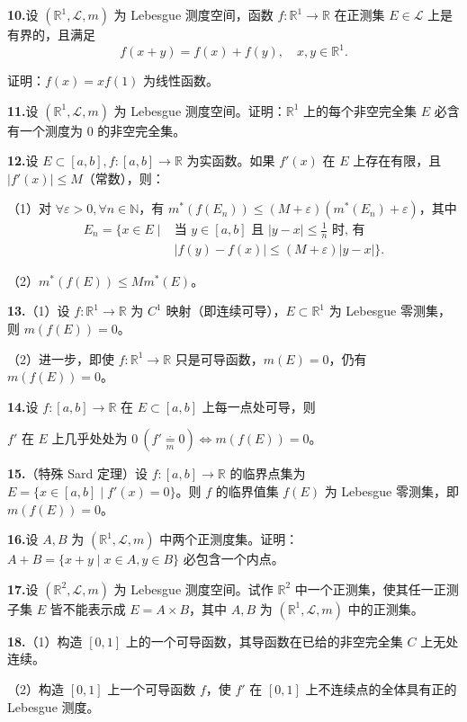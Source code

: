 \documentclass[11pt,a4paper]{article}
\begin{document}
\par{}\noindent\hypertarget{review-q10}{}\textbf{10.}\quad 设 $(\mathbb R^1,\mathcal L,m)$ 为 Lebesgue 测度空间，函数 $f:\mathbb R^1\to\mathbb R$ 在正测集 $E\in\mathcal L$ 上是有界的，且满足
\[f(x+y)=f(x)+f(y),\quad x,y\in\mathbb R^1.\]
\par\noindent 证明：$f(x)=xf(1)$ 为线性函数。
\par{}\noindent\hypertarget{review-q11}{}\textbf{11.}\quad 设 $(\mathbb R^1,\mathcal L,m)$ 为 Lebesgue 测度空间。证明：$\mathbb R^1$ 上的每个非空完全集 $E$ 必含有一个测度为 $0$ 的非空完全集。
\par{}\noindent\hypertarget{review-q12}{}\textbf{12.}\quad 设 $E\subset[a,b],f:[a,b]\to\mathbb R$ 为实函数。如果 $f'(x)$ 在 $E$ 上存在有限，且 $|f'(x)|\leq M$（常数），则：
\par\noindent （1）对 $\forall\varepsilon>0,\forall n\in\mathbb N$，有 $m^*(f(E_n))\leq(M+\varepsilon)(m^*(E_n)+\varepsilon)$，其中
\[\begin{aligned}E_n=\{x\in E\mid{}&\text{当 }y\in[a,b]\text{ 且 }|y-x|\leq\tfrac1n\text{ 时, 有}\\ &|f(y)-f(x)|\leq(M+\varepsilon)|y-x|\}.\end{aligned}\]
\par\noindent （2）$m^*(f(E))\leq M m^*(E)$。
\par{}\noindent\hypertarget{review-q13}{}\textbf{13.}\quad （1）设 $f:\mathbb R^1\to\mathbb R$ 为 $C^1$ 映射（即连续可导），$E\subset\mathbb R^1$ 为 Lebesgue 零测集，则 $m(f(E))=0$。
\par\noindent （2）进一步，即使 $f:\mathbb R^1\to\mathbb R$ 只是可导函数，$m(E)=0$，仍有 $m(f(E))=0$。
\par{}\noindent\hypertarget{review-q14}{}\textbf{14.}\quad 设 $f:[a,b]\to\mathbb R$ 在 $E\subset[a,b]$ 上每一点处可导，则
\par\noindent $f'$ 在 $E$ 上几乎处处为 $0\ (f'\underset{m}{\overset{\cdot}{=}}0)\Leftrightarrow m(f(E))=0$。
\par{}\noindent\hypertarget{review-q15}{}\textbf{15.}\quad （特殊 Sard 定理）设 $f:[a,b]\to\mathbb R$ 的临界点集为 $E=\{x\in[a,b]\mid f'(x)=0\}$。则 $f$ 的临界值集 $f(E)$ 为 Lebesgue 零测集，即 $m(f(E))=0$。
\par{}\noindent\hypertarget{review-q16}{}\textbf{16.}\quad 设 $A,B$ 为 $(\mathbb R^1,\mathcal L,m)$ 中两个正测度集。证明：$A+B=\{x+y\mid x\in A,y\in B\}$ 必包含一个内点。
\par{}\noindent\hypertarget{review-q17}{}\textbf{17.}\quad 设 $(\mathbb R^2,\mathcal L,m)$ 为 Lebesgue 测度空间。试作 $\mathbb R^2$ 中一个正测集，使其任一正测子集 $E$ 皆不能表示成 $E=A\times B$，其中 $A,B$ 为 $(\mathbb R^1,\mathcal L,m)$ 中的正测集。
\par{}\noindent\hypertarget{review-q18}{}\textbf{18.}\quad （1）构造 $[0,1]$ 上的一个可导函数，其导函数在已给的非空完全集 $C$ 上无处连续。
\par\noindent （2）构造 $[0,1]$ 上一个可导函数 $f$，使 $f'$ 在 $[0,1]$ 上不连续点的全体具有正的 Lebesgue 测度。
\end{document}
